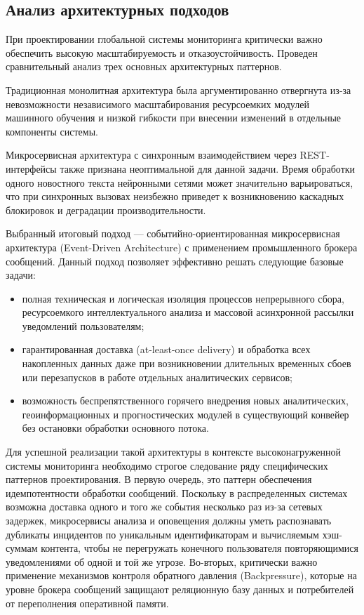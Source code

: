 \subsection{Анализ архитектурных подходов}

При проектировании глобальной системы мониторинга критически важно обеспечить высокую масштабируемость и отказоустойчивость. Проведен сравнительный анализ трех основных архитектурных паттернов.

Традиционная монолитная архитектура была аргументированно отвергнута из-за невозможности независимого масштабирования ресурсоемких модулей машинного обучения и низкой гибкости при внесении изменений в отдельные компоненты системы.

Микросервисная архитектура с синхронным взаимодействием через REST-интерфейсы также признана неоптимальной для данной задачи. Время обработки одного новостного текста нейронными сетями может значительно варьироваться, что при синхронных вызовах неизбежно приведет к возникновению каскадных блокировок и деградации производительности.

Выбранный итоговый подход — событийно-ориентированная микросервисная архитектура (Event-Driven Architecture) с применением промышленного брокера сообщений. Данный подход позволяет эффективно решать следующие базовые задачи:
\begin{itemize}
\item полная техническая и логическая изоляция процессов непрерывного сбора, ресурсоемкого интеллектуального анализа и массовой асинхронной рассылки уведомлений пользователям;
\item гарантированная доставка (at-least-once delivery) и обработка всех накопленных данных даже при возникновении длительных временных сбоев или перезапусков в работе отдельных аналитических сервисов;
\item возможность беспрепятственного горячего внедрения новых аналитических, геоинформационных и прогностических модулей в существующий конвейер без остановки обработки основного потока.
\end{itemize}

Для успешной реализации такой архитектуры в контексте высоконагруженной системы мониторинга необходимо строгое следование ряду специфических паттернов проектирования. В первую очередь, это паттерн обеспечения идемпотентности обработки сообщений. Поскольку в распределенных системах возможна доставка одного и того же события несколько раз из-за сетевых задержек, микросервисы анализа и оповещения должны уметь распознавать дубликаты инцидентов по уникальным идентификаторам и вычисляемым хэш-суммам контента, чтобы не перегружать конечного пользователя повторяющимися уведомлениями об одной и той же угрозе. Во-вторых, критически важно применение механизмов контроля обратного давления (Backpressure), которые на уровне брокера сообщений защищают реляционную базу данных и потребителей от переполнения оперативной памяти.


